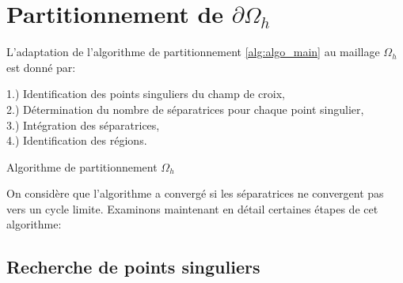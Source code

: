 \section{Partitionnement de $\partial\Omega_h$}

L'adaptation de l'algorithme de partitionnement \ref{alg:algo_main} au maillage $\Omega_h$ est donné par:\\

\begin{algorithm}[H]
\label{alg:discr_algo_main}
\vspace{0.2cm}
1.) Identification des points singuliers du champ de croix,\\\vspace{0.2cm}
2.) Détermination du nombre de séparatrices pour chaque point singulier,\\\vspace{0.2cm}
3.) Intégration des séparatrices,\\\vspace{0.2cm}
4.) Identification des régions.\\\vspace{0.2cm}
\caption{Algorithme de partitionnement $\Omega_h$}
\end{algorithm}
\vspace{0.5cm}
On considère que l'algorithme a convergé si les séparatrices ne convergent pas vers un cycle limite. Examinons maintenant en détail certaines étapes de cet algorithme:

\subsection{Recherche de points singuliers}

